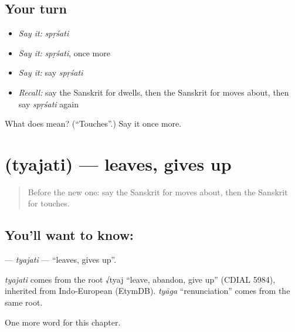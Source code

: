 \subsection*{Your turn}
\begin{itemize}
\raggedright
  \item \emph{Say it:} \emph{spṛśati}
  \item \emph{Say it:} \emph{spṛśati}, once more
  \item \emph{Say it:} say \emph{spṛśati}
  \item \emph{Recall:} say the Sanskrit for dwells, then the Sanskrit for moves about, then say \emph{spṛśati} again
\end{itemize}

\begin{tcolorbox}[breakable,colback=teal!4,colframe=teal!35!black,title={Before you move on}]
What does  mean? (\textquotedblleft{}Touches\textquotedblright{}.) Say it once more.
\end{tcolorbox}
\section[\texorpdfstring{\sk{त्यजति} (tyajati)}{त्यजति (tyajati)}]{ (tyajati) — leaves, gives up}

\label{lesson:SA-C141-tyajati}



\begin{quote}
Before the new one: say the Sanskrit for moves about, then the Sanskrit for touches.
\end{quote}

\subsection*{You'll want to know: }
\textbf{} — \emph{tyajati} — \textquotedblleft{}leaves, gives up\textquotedblright{}.

\begin{cousinweb}
\emph{tyajati} comes from the root √tyaj \textquotedblleft{}leave, abandon, give up\textquotedblright{} (CDIAL 5984), inherited from Indo-European (EtymDB). \emph{tyāga} \textquotedblleft{}renunciation\textquotedblright{} comes from the same root.
\end{cousinweb}

\begin{grammarlens}[title={What you've built}]
One more word for this chapter.
\end{grammarlens}

